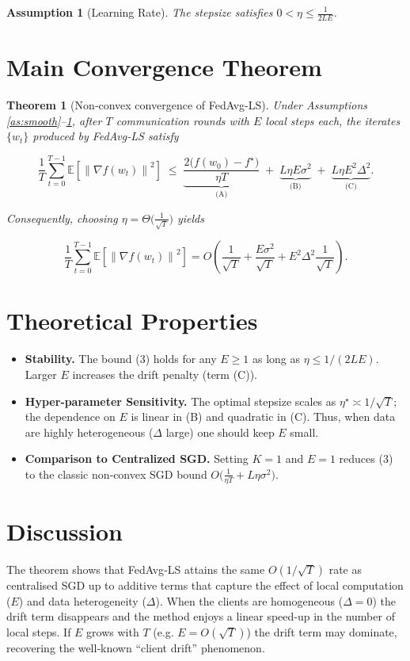 \documentclass{article}
\newcommand{\E}{\mathbb{E}}
\newcommand{\norm}[1]{\left\|#1\right\|}
\newtheorem{theorem}{Theorem}
\newtheorem{assumption}{Assumption}
\begin{document}
\begin{assumption}[Learning Rate]\label{as:lr}
The stepsize satisfies $0<\eta\le\frac{1}{2L\!E}$.
\end{assumption}

\section*{Main Convergence Theorem}
\begin{theorem}[Non‑convex convergence of FedAvg-LS]\label{thm:main}
Under Assumptions \ref{as:smooth}–\ref{as:lr}, after $T$ communication rounds
with $E$ local steps each, the iterates $\{w_t\}$ produced by FedAvg‑LS satisfy  

\[
\frac1T\sum_{t=0}^{T-1}\E\!\left[\norm{\nabla f(w_t)}^2\right]
\;\le\;
\underbrace{\frac{2\bigl(f(w_0)-f^\star\bigr)}{\eta T}}_{\text{(A)}}
\;+\;
\underbrace{L\eta E\sigma^2}_{\text{(B)}}
\;+\;
\underbrace{L\eta E^2\Delta^2}_{\text{(C)}} .
\tag{3}
\]

Consequently, choosing $\eta = \Theta\!\bigl(\tfrac{1}{\sqrt{T}}\bigr)$ yields  

\[
\frac1T\sum_{t=0}^{T-1}\E\!\left[\norm{\nabla f(w_t)}^2\right]
= O\!\left(\frac{1}{\sqrt{T}}+ \frac{E\sigma^2}{\sqrt{T}}+E^2\Delta^2\frac{1}{\sqrt{T}}\right).
\]
\end{theorem}

\section*{Theoretical Properties}
\begin{itemize}
\item \textbf{Stability.}  The bound (3) holds for any $E\ge 1$ as long as 
$\eta\le 1/(2LE)$.  Larger $E$ increases the drift penalty (term (C)).
\item \textbf{Hyper‑parameter Sensitivity.}  The optimal stepsize scales as 
$\eta^\star\asymp 1/\sqrt{T}$; the dependence on $E$ is linear in (B) and quadratic in (C).  
Thus, when data are highly heterogeneous ($\Delta$ large) one should keep $E$ small.
\item \textbf{Comparison to Centralized SGD.}  Setting $K=1$ and $E=1$ reduces (3) to the classic non‑convex SGD bound 
$O\!\bigl(\frac{1}{\eta T}+L\eta\sigma^2\bigr)$.
\end{itemize}

\section*{Discussion}
The theorem shows that FedAvg‑LS attains the same $O(1/\sqrt{T})$ rate as
centralised SGD up to additive terms that capture the effect of
local computation ($E$) and data heterogeneity ($\Delta$).  When the
clients are homogeneous ($\Delta=0$) the drift term disappears and the
method enjoys a linear speed‑up in the number of local steps.
If $E$ grows with $T$ (e.g. $E=O(\sqrt{T})$) the drift term may dominate,
recovering the well‑known “client drift” phenomenon.
\end{document}

